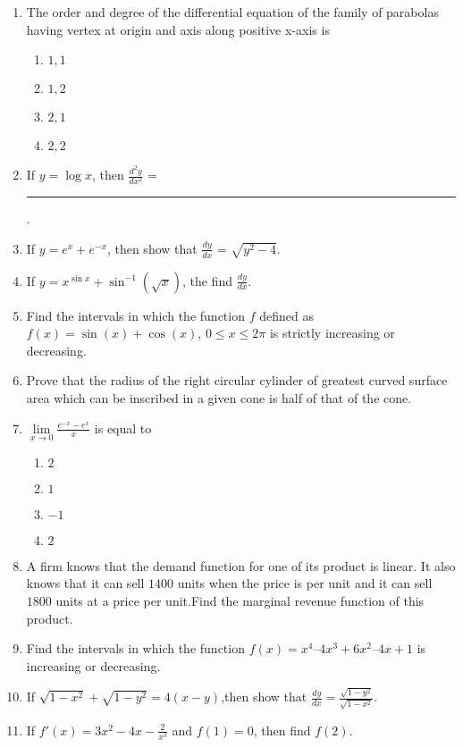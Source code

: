 \begin{enumerate}
\item The order and degree of the differential equation of the family of parabolas having vertex at origin and axis along positive x-axis is
\begin{enumerate}
    \item $1,1$
    \item $1,2$
    \item $2,1$
    \item $2,2$
\end{enumerate}
\item If $y = \log x$, then $\frac{d^2y}{dx^2}$ =  \rule{30pt}{1pt}.
\item If $y = e^x + e^{-x}$, then show that $\frac{dy}{dx}$ = $\sqrt{y^2 - 4}$.

\item If $y=x^{\sin x }+\sin^{-1}(\sqrt x)$, the find $\frac{dy}{dx}$.
\item Find the intervals in which the function $f$ defined as $f(x) = \sin(x) + \cos(x)$, $0 \leq x \leq 2\pi$ is strictly increasing or decreasing.
\item Prove that the radius of the right circular cylinder of greatest curved surface area which can be inscribed in a given cone is half of that of the cone. 
\item $\lim\limits_{x \to 0}{\frac{e^{-x} - e^x}{x}}$ is equal to
\begin{enumerate}
    \item $2$
    \item $1$
    \item $-1$
    \item $2$
\end{enumerate}


	\item A firm knows that the demand function for one of its product is linear. It also knows that it can sell $1400$ units when the price is  per unit and it can sell $1800$ units at a price  per unit.Find the marginal revenue function of this product.

\item Find the intervals in which the function $f(x) = x^{4}–4x^{3}+6x^{2}–4x+1$ is increasing or decreasing.

\item If $\sqrt{1-x^{2}}+\sqrt{1-y^{2}}=4(x-y)$,then show that $\frac{dy}{dx}=\frac{\sqrt{1-y^{2}}}{\sqrt{1-x^{2}}}$.


\item If $f'(x)=3x^{2}-4x-\frac{2}{x^{3}}$ and $f(1)=0$, then find $f(2)$.


\end{enumerate}
